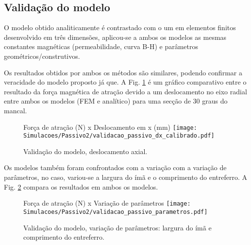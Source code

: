 

\subsection{Validação do modelo}

O modelo obtido analiticamente é contrastado com o um em elementos finitos desenvolvido em três dimensões, aplicou-se a ambos os modelos as mesmas constantes magnéticas (permeabilidade, curva B-H) e parâmetros geométricos/construtivos.

Os resultados obtidos por ambos os métodos são similares, podendo confirmar a veracidade do modelo proposto já que. A Fig. \ref{fig:validacao_passivo_dx_calibrado} é um gráfico comparativo entre o resultado da força magnética de atração devido a um deslocamento no eixo radial entre ambos os modelos (FEM e analítico) para uma secção de 30 graus do mancal.

\begin{figure}[th!]
\centering
Força de atração (N) x Deslocamento em x (mm)
\texttt{[image: Simulacoes/Passivo2/validacao\_passivo\_dx\_calibrado.pdf]}
\caption{Validação do modelo, deslocamento axial.}
\label{fig:validacao_passivo_dx_calibrado}
\end{figure}

Os modelos também foram confrontados com a variação com a variação de parâmetros, no caso, variou-se a largura do ímã e o comprimento do entreferro. A Fig. \ref{fig:validacao_passivo_parametros} compara os resultados em ambos os modelos.

\begin{figure}[th!]
	\centering
	Força de atração (N) x Variação de parâmetros
	\texttt{[image: Simulacoes/Passivo2/validacao\_passivo\_parametros.pdf]}
	\caption{Validação do modelo, variação de parâmetros: largura do ímã e comprimento do entreferro.}
	\label{fig:validacao_passivo_parametros}
\end{figure} 

